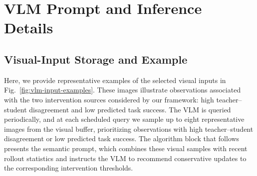 %
% 

\section{VLM Prompt and Inference Details}
\label{app:vlm_inference_details}

\subsection{Visual-Input Storage and Example}
Here, we provide representative examples of the selected visual inputs in
Fig.~\ref{fig:vlm-input-examples}. These images illustrate observations
associated with the two intervention sources considered by our framework:
high teacher--student disagreement and low predicted task success. The
VLM is queried periodically, and at each scheduled query we sample up to eight
representative images from the visual buffer, prioritizing observations with
high teacher--student disagreement or low predicted task success. The
algorithm block that follows presents the semantic prompt, which combines
these visual samples with recent rollout statistics and instructs the VLM to
recommend conservative updates to the corresponding intervention thresholds.

